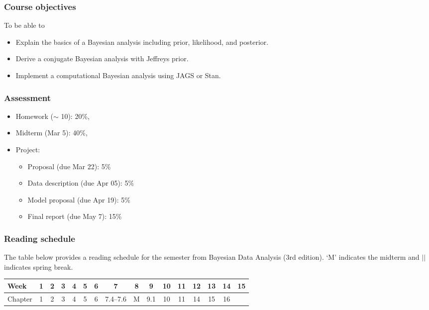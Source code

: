 \documentclass[12pt]{article}
\begin{document}
\subsubsection*{Course objectives}
To be able to
\begin{itemize}
\item Explain the basics of a Bayesian analysis including prior, likelihood, and posterior.
\item Derive a conjugate Bayesian analysis with Jeffreys prior.
\item Implement a computational Bayesian analysis using JAGS or Stan.
\end{itemize}

\subsubsection*{Assessment}

\begin{itemize}
\item Homework ($\sim$ 10): 20\%,
\item Midterm (Mar 5): 40\%,
\item Project:
  \begin{itemize}
  \item Proposal (due Mar 22): 5\%
  \item Data description (due Apr 05): 5\%
  \item Model proposal (due Apr 19): 5\%
  \item Final report (due May 7): 15\%
  \end{itemize}
\end{itemize}

\subsubsection*{Reading schedule}

The table below provides a reading schedule for the semester from
Bayesian Data Analysis (3rd edition).
`M' indicates the midterm and $\vert\vert$ indicates spring break.

\vspace{0.2in}

\begin{tabular}{|l|cccccccc||ccccccc|}
\hline
Week    & 1 & 2 & 3 & 4 & 5 & 6 & 7        & 8    & 9 & 10 & 11 & 12 & 13 & 14 & 15 \\
\hline
Chapter & 1 & 2 & 3 & 4 & 5 & 6 & 7.4--7.6 & M & 9.1 & 10 & 11 & 14 & 15 & 16 & \\
\hline
\end{tabular}
\end{document}
